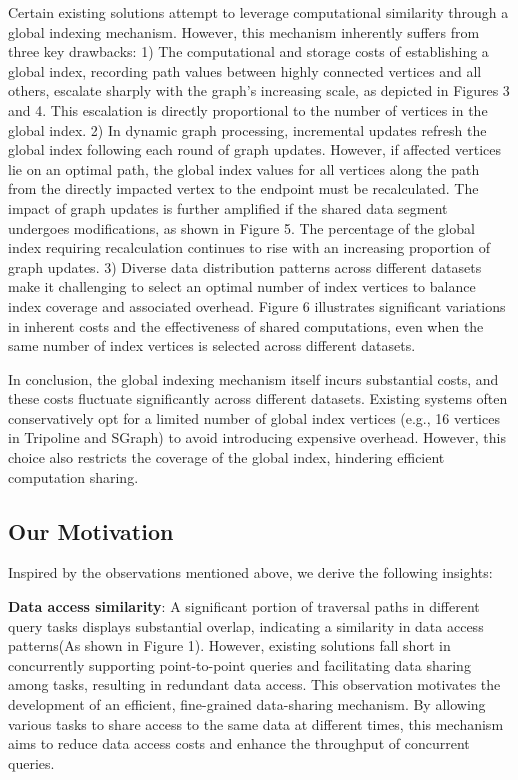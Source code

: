 \documentclass[lettersize,journal]{IEEEtran} %
\begin{document}
Certain existing solutions attempt to leverage computational similarity through a global indexing mechanism\cite{tripoline}\cite{sgraph}. However, this mechanism inherently suffers from three key drawbacks: 1) The computational and storage costs of establishing a global index, recording path values between highly connected vertices and all others, escalate sharply with the graph's increasing scale, as depicted in Figures 3 and 4. This escalation is directly proportional to the number of vertices in the global index. 2) In dynamic graph processing, incremental updates refresh the global index following each round of graph updates. However, if affected vertices lie on an optimal path, the global index values for all vertices along the path from the directly impacted vertex to the endpoint must be recalculated. The impact of graph updates is further amplified if the shared data segment undergoes modifications, as shown in Figure 5. The percentage of the global index requiring recalculation continues to rise with an increasing proportion of graph updates. 3) Diverse data distribution patterns across different datasets make it challenging to select an optimal number of index vertices to balance index coverage and associated overhead. Figure 6 illustrates significant variations in inherent costs and the effectiveness of shared computations, even when the same number of index vertices is selected across different datasets.

In conclusion, the global indexing mechanism itself incurs substantial costs, and these costs fluctuate significantly across different datasets. Existing systems often conservatively opt for a limited number of global index vertices (e.g., 16 vertices in Tripoline\cite{tripoline} and SGraph\cite{sgraph}) to avoid introducing expensive overhead. However, this choice also restricts the coverage of the global index, hindering efficient computation sharing.

\subsection{Our Motivation}
Inspired by the observations mentioned above, we derive the following insights:

{\bf{Data access similarity}}: A significant portion of traversal paths in different query tasks displays substantial overlap, indicating a similarity in data access patterns(As shown in Figure 1). However, existing solutions fall short in concurrently supporting point-to-point queries and facilitating data sharing among tasks, resulting in redundant data access. This observation motivates the development of an efficient, fine-grained data-sharing mechanism. By allowing various tasks to share access to the same data at different times, this mechanism aims to reduce data access costs and enhance the throughput of concurrent queries.
\end{document}
